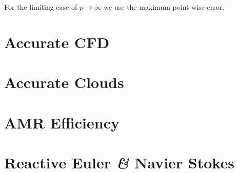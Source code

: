 For the limiting case of $p \to \infty$ we use the maximum point-wise error.

\section{Accurate CFD}
\section{Accurate Clouds}
\section{AMR Efficiency}
\section{Reactive Euler \textit{\&} Navier Stokes}

